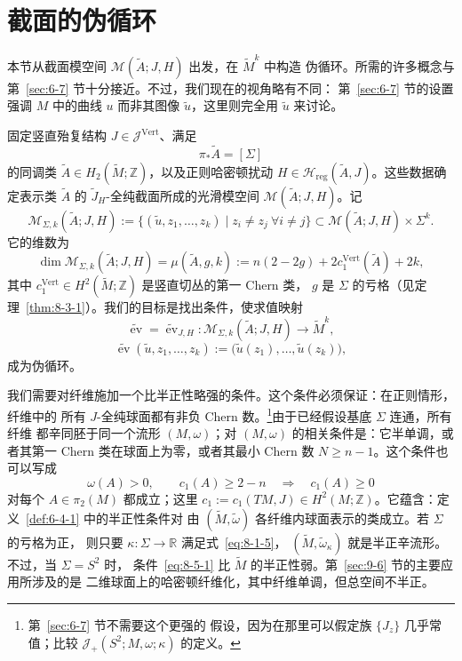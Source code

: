 
\section{截面的伪循环}\label{sec:8-5}

本节从截面模空间 $\mathcal M(\widetilde A;J,H)$ 出发，在 $\widetilde M^k$ 中构造
伪循环。所需的许多概念与第~\ref{sec:6-7} 节十分接近。不过，我们现在的视角略有不同：
第~\ref{sec:6-7} 节的设置强调 $M$ 中的曲线 $u$ 而非其图像 $\widetilde u$，这里则完全用
$\widetilde u$ 来讨论。

固定竖直殆复结构 $J\in\mathcal J^{\mathrm{Vert}}$、满足
\[
  \pi_*\widetilde A=[\Sigma]
\]
的同调类 $\widetilde A\in H_2(\widetilde M;\mathbb Z)$，以及正则哈密顿扰动
$H\in\mathcal H_{\mathrm{reg}}(\widetilde A,J)$。这些数据确定表示类 $\widetilde A$ 的
$\widetilde J_H$-全纯截面所成的光滑模空间
$\mathcal M(\widetilde A;J,H)$。记
\[
  \mathcal M_{\Sigma,k}(\widetilde A;J,H)
  :=\bigl\{(\widetilde u,z_1,\ldots,z_k)\mid
  z_i\ne z_j\ \forall i\ne j\bigr\}
  \subset\mathcal M(\widetilde A;J,H)\times\Sigma^k.
\]
它的维数为
\[
  \dim\mathcal M_{\Sigma,k}(\widetilde A;J,H)
  =\mu(\widetilde A,g,k)
  :=n(2-2g)+2c_1^{\mathrm{Vert}}(\widetilde A)+2k,
\]
其中 $c_1^{\mathrm{Vert}}\in H^2(\widetilde M;\mathbb Z)$ 是竖直切丛的第一 Chern 类，
$g$ 是 $\Sigma$ 的亏格（见定理~\ref{thm:8-3-1}）。我们的目标是找出条件，使求值映射
\[
  \widetilde{\operatorname{ev}}
  =\widetilde{\operatorname{ev}}_{J,H}:
  \mathcal M_{\Sigma,k}(\widetilde A;J,H)\longrightarrow\widetilde M^k,
\]
\[
  \widetilde{\operatorname{ev}}(\widetilde u,z_1,\ldots,z_k)
  :=\bigl(\widetilde u(z_1),\ldots,\widetilde u(z_k)\bigr),
\]
成为伪循环。

我们需要对纤维施加一个比半正性略强的条件。这个条件必须保证：在正则情形，纤维中的
所有 $J$-全纯球面都有非负 Chern 数。\footnote{第~\ref{sec:6-7} 节不需要这个更强的
假设，因为在那里可以假定族 $\{J_z\}$ 几乎常值；比较
$\mathcal J_+(S^2;M,\omega;\kappa)$ 的定义。}由于已经假设基底 $\Sigma$ 连通，所有纤维
都辛同胚于同一个流形 $(M,\omega)$；对 $(M,\omega)$ 的相关条件是：它半单调，或者其第一
Chern 类在球面上为零，或者其最小 Chern 数 $N\ge n-1$。这个条件也可以写成
\begin{equation}\label{eq:8-5-1}
  \omega(A)>0,\qquad c_1(A)\ge2-n
  \quad\Longrightarrow\quad c_1(A)\ge0
\end{equation}
对每个 $A\in\pi_2(M)$ 都成立；这里
$c_1:=c_1(TM,J)\in H^2(M;\mathbb Z)$。它蕴含：定义~\ref{def:6-4-1} 中的半正性条件对
由 $(\widetilde M,\widetilde\omega)$ 各纤维内球面表示的类成立。若 $\Sigma$ 的亏格为正，
则只要 $\kappa:\Sigma\to\mathbb R$ 满足式~\eqref{eq:8-1-5}，
$(\widetilde M,\widetilde\omega_\kappa)$ 就是半正辛流形。不过，当 $\Sigma=S^2$ 时，
条件~\eqref{eq:8-5-1} 比 $\widetilde M$ 的半正性弱。第~\ref{sec:9-6} 节的主要应用所涉及的是
二维球面上的哈密顿纤维化，其中纤维单调，但总空间不半正。

